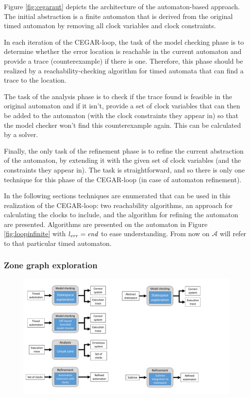 Figure \ref{fig:cegaraut} depicts the architecture of the automaton-based approach. The initial abstraction is a finite automaton that is derived from the original timed automaton by removing all clock variables and clock constraints. 

In each iteration of the CEGAR-loop, the task of the model checking phase is to determine whether the error location is reachable in the current automaton and provide a trace (counterexample) if there is one. Therefore, this phase should be realized by a reachability-checking algorithm for timed automata that can find a trace to the location.

The task of the analysis phase is to check if the trace found is feasible in the original automaton and if it isn't, provide a set of clock variables that can then be added to the automaton (with the clock constraints they appear in) so that the model checker won't find this counterexample again. This can be calculated by a solver.

Finally, the only task of the refinement phase is to refine the current abstraction of the automaton, by extending it with the given set of clock variables (and the constraints they appear in). The task is straightforward, and so there is only one technique for this phase of the CEGAR-loop (in case of automaton refinement).


In the following sections techniques are enumerated that can be used in this realization of the CEGAR-loop: two reachability algorithms, an approach for calculating the clocks to include, and the algorithm for refining the automaton are presented. Algorithms are presented on the automaton in Figure \ref{fig:loopinfinite} with $l_{err}=\text{\emph{end}}$ to ease understanding. From now on $\mathcal{A}$ will refer to that particular timed automaton.

\subsubsection{Zone graph exploration} 

\begin{figure} [h]
	\centering
	\includegraphics[width=.7\textwidth]{include/figures/modules_ta_mc}
\end{figure}

